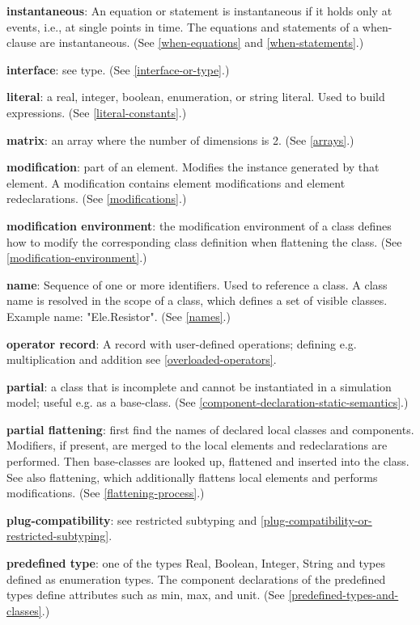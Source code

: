 \documentclass[10pt,a4paper]{report}
\begin{document}
\textbf{instantaneous}: An equation or statement is instantaneous if it
holds only at events, i.e., at single points in time. The equations and
statements of a when-clause are instantaneous. (See \ref{when-equations} and
\ref{when-statements}.)

\textbf{interface}: see type. (See \ref{interface-or-type}.)

\textbf{literal}: a real, integer, boolean, enumeration, or string
literal. Used to build expressions. (See \ref{literal-constants}.)

\textbf{matrix}: an array where the number of dimensions is 2. (See
\ref{arrays}.)

\textbf{modification}: part of an element. Modifies the instance
generated by that element. A modification contains element modifications
and element redeclarations. (See \ref{modifications}.)

\textbf{modification environment}: the modification environment of a
class defines how to modify the corresponding class definition when
flattening the class. (See \ref{modification-environment}.)

\textbf{name}: Sequence of one or more identifiers. Used to reference a
class. A class name is resolved in the scope of a class, which defines a
set of visible classes. Example name: "Ele.Resistor". (See \ref{names}.)

\textbf{operator record}: A record with user-defined operations;
defining e.g. multiplication and addition see \ref{overloaded-operators}.

\textbf{partial}: a class that is incomplete and cannot be instantiated
in a simulation model; useful e.g. as a base-class. (See \ref{component-declaration-static-semantics}.)

\textbf{partial flattening}: first find the names of declared local
classes and components. Modifiers, if present, are merged to the local
elements and redeclarations are performed. Then base-classes are looked
up, flattened and inserted into the class. See also flattening, which
additionally flattens local elements and performs modifications. (See
\ref{flattening-process}.)

\textbf{plug-compatibility}: see restricted subtyping and \ref{plug-compatibility-or-restricted-subtyping}.

\textbf{predefined type}: one of the types Real, Boolean, Integer,
String and types defined as enumeration types. The component
declarations of the predefined types define attributes such as min, max,
and unit. (See \ref{predefined-types-and-classes}.)
\end{document}
